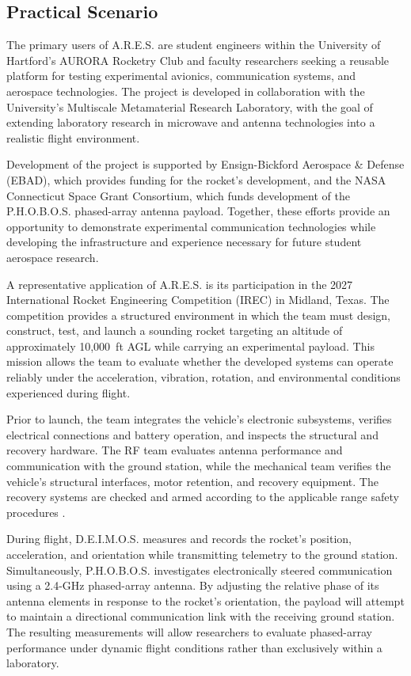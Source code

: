 \documentclass[11pt]{IEEEtran}
\newcommand{\ares}{A.R.E.S.}
\newcommand{\phobos}{P.H.O.B.O.S.}
\newcommand{\deimos}{D.E.I.M.O.S.}
\begin{document}
\subsection{Practical Scenario}
The primary users of \ares{} are student engineers within the University of Hartford's AURORA Rocketry Club and faculty researchers seeking a reusable platform for testing experimental avionics, communication systems, and aerospace technologies.
The project is developed in collaboration with the University's Multiscale Metamaterial Research Laboratory, with the goal of extending laboratory research in microwave and antenna technologies into a realistic flight environment.

Development of the project is supported by Ensign-Bickford Aerospace \& Defense (EBAD), which provides funding for the rocket's development, and the NASA Connecticut Space Grant Consortium, which funds development of the \phobos{} phased-array antenna payload.
Together, these efforts provide an opportunity to demonstrate experimental communication technologies while developing the infrastructure and experience necessary for future student aerospace research.

A representative application of \ares{} is its participation in the 2027 International Rocket Engineering Competition (IREC) in Midland, Texas.
The competition provides a structured environment in which the team must design, construct, test, and launch a sounding rocket targeting an altitude of approximately 10,000~ft AGL while carrying an experimental payload.
This mission allows the team to evaluate whether the developed systems can operate reliably under the acceleration, vibration, rotation, and environmental conditions experienced during flight.

Prior to launch, the team integrates the vehicle's electronic subsystems, verifies electrical connections and battery operation, and inspects the structural and recovery hardware.
The RF team evaluates antenna performance and communication with the ground station, while the mechanical team verifies the vehicle's structural interfaces, motor retention, and recovery equipment.
The recovery systems are checked and armed according to the applicable range safety procedures \cite{tripoliCode}.

During flight, \deimos{} measures and records the rocket's position, acceleration, and orientation while transmitting telemetry to the ground station.
Simultaneously, \phobos{} investigates electronically steered communication using a 2.4-GHz phased-array antenna.
By adjusting the relative phase of its antenna elements in response to the rocket's orientation, the payload will attempt to maintain a directional communication link with the receiving ground station.
The resulting measurements will allow researchers to evaluate phased-array performance under dynamic flight conditions rather than exclusively within a laboratory.
\end{document}
